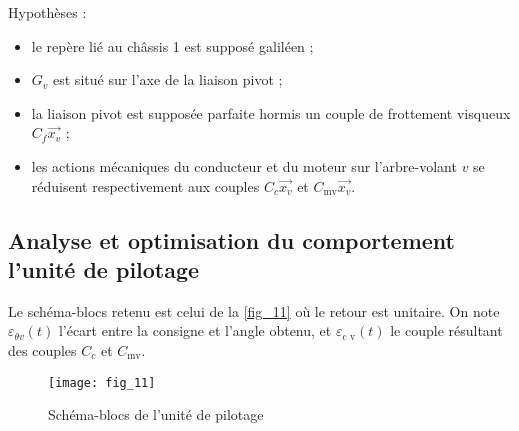Hypothèses :
\begin{itemize}
\item le repère lié au châssis 1 est supposé galiléen ;
\item $G_v$ est situé sur l'axe de la liaison pivot ;
\item la liaison pivot est supposée parfaite hormis un couple de frottement visqueux $C_f \vec{x_v}$
;
\item les actions mécaniques du conducteur et du moteur sur l'arbre-volant $v$ se réduisent
respectivement aux couples $C_c \vec{x_v}$ et $C_{\text{mv}} \vec{x_v}$.
\end{itemize}
%
%
%
%
%
%

\subsection*{Analyse et optimisation du comportement l'unité de pilotage}


Le schéma-blocs retenu est celui de la \autoref{fig_11} où le retour est unitaire. On note $\varepsilon_{\theta v}(t)$ l'écart entre la consigne et l'angle obtenu, et $\varepsilon_{\text{c v}}(t)$ le
couple résultant des couples $C_c$ et $C_{\text{mv}}$.






\begin{figure}[H]
\centering
\texttt{[image: fig\_11]}

\caption{Schéma-blocs de l'unité de pilotage  \label{fig_11}}
\end{figure}


